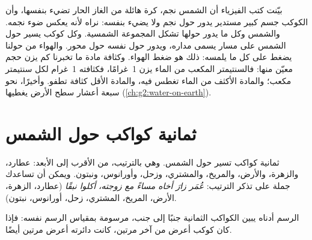 \begin{recall}
بيّنت كتب الفيزياء أن الشمس نجم، كرة هائلة من الغاز الحار
تضيء بنفسها، وأن الكوكب جسم كبير مستدير يدور
حول نجم ولا يضيء بنفسه: نراه لأنه يعكس
ضوء نجمه. والشمس وكل ما يدور حولها تشكل
المجموعة الشمسية. وكل كوكب يسير حول الشمس على مسار يسمى
مداره، ويدور حول نفسه حول محور. والهواء من حولنا يضغط
على كل ما يلمسه: ذلك هو ضغط الهواء. وكثافة مادة ما
تخبرنا كم يزن حجم معيّن منها: فالسنتيمتر المكعب من الماء
يزن 1~غرامًا، فكثافته 1~غرام لكل سنتيمتر مكعب؛ والمادة
الأكثف من الماء تغطس فيه، والمادة الأقل كثافة تطفو. وأخيرًا، نحو سبعة أعشار
سطح الأرض يغطيها 
(\cref{ch:g2:water-on-earth}).
\end{recall}

\section{ثمانية كواكب حول الشمس}

ثمانية كواكب تسير حول الشمس. وهي بالترتيب، من الأقرب إلى
الأبعد: عطارد، والزهرة، والأرض، والمريخ، والمشتري، وزحل،
وأورانوس، ونبتون. ويمكن أن تساعدك جملة على تذكر الترتيب: \emph{عُمَر
زارَ أخاه مساءً مع زوجته، أكلوا نبقًا} (عطارد، الزهرة، الأرض، المريخ،
المشتري، زحل، أورانوس، نبتون).

الرسم أدناه يبين الكواكب الثمانية جنبًا إلى جنب، مرسومة بمقياس
الرسم نفسه: فإذا كان كوكب أعرض من آخر مرتين، كانت دائرته أعرض
مرتين أيضًا.

